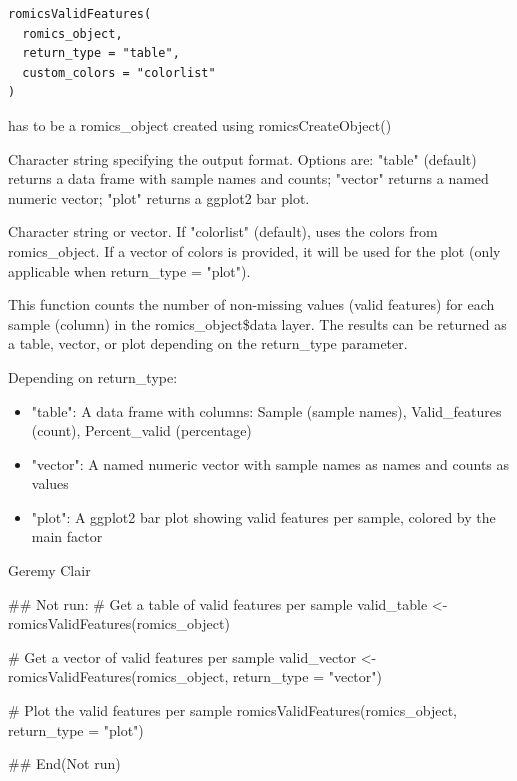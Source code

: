 \documentclass[a4paper]{book}
\begin{document}
%
\begin{Usage}
\begin{verbatim}
romicsValidFeatures(
  romics_object,
  return_type = "table",
  custom_colors = "colorlist"
)
\end{verbatim}
\end{Usage}
%
\begin{Arguments}
\begin{ldescription}
\item[\code{romics\_object}] has to be a romics\_object created using romicsCreateObject()

\item[\code{return\_type}] Character string specifying the output format. Options are: "table" (default) returns a data frame with sample names and counts; "vector" returns a named numeric vector; "plot" returns a ggplot2 bar plot.

\item[\code{custom\_colors}] Character string or vector. If "colorlist" (default), uses the colors from romics\_object. If a vector of colors is provided, it will be used for the plot (only applicable when return\_type = "plot").
\end{ldescription}
\end{Arguments}
%
\begin{Details}
This function counts the number of non-missing values (valid features) for each sample (column) in the romics\_object\$data layer. The results can be returned as a table, vector, or plot depending on the return\_type parameter.
\end{Details}
%
\begin{Value}
Depending on return\_type:
\begin{itemize}

\item{} "table": A data frame with columns: Sample (sample names), Valid\_features (count), Percent\_valid (percentage)
\item{} "vector": A named numeric vector with sample names as names and counts as values
\item{} "plot": A ggplot2 bar plot showing valid features per sample, colored by the main factor

\end{itemize}

\end{Value}
%
\begin{Author}
Geremy Clair
\end{Author}
%
\begin{Examples}
\begin{ExampleCode}
## Not run: 
# Get a table of valid features per sample
valid_table <- romicsValidFeatures(romics_object)

# Get a vector of valid features per sample
valid_vector <- romicsValidFeatures(romics_object, return_type = "vector")

# Plot the valid features per sample
romicsValidFeatures(romics_object, return_type = "plot")

## End(Not run)
\end{ExampleCode}
\end{Examples}
\end{document}
